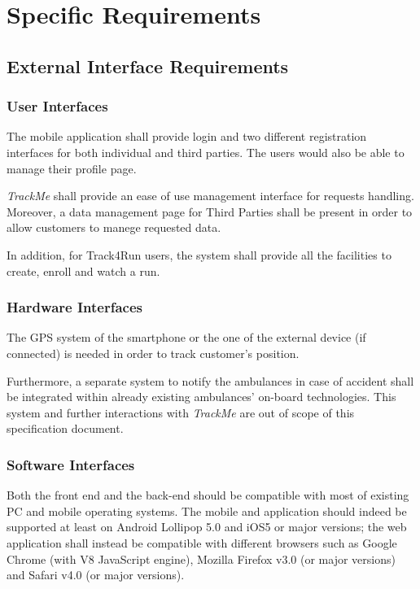 \documentclass[a4paper]{article}
\begin{document}
\section{Specific Requirements}

    \subsection{External Interface Requirements}
        
        \subsubsection{User Interfaces}
        
        The mobile application shall provide login and two different registration interfaces for both individual and third parties. The users would also be able to manage their profile page.
        
        \textit{TrackMe} shall provide an ease of use management interface for requests handling. Moreover, a data management page for Third Parties shall be present in order to allow customers to manege requested data.
        
        In addition, for Track4Run users, the system shall provide all the facilities to create, enroll and watch a run.
        
        \subsubsection{Hardware Interfaces}
        The GPS system of the smartphone or the one of the external device (if connected) is needed in order to track customer's position.
        
        Furthermore, a separate system to notify the ambulances in case of accident shall be integrated within already existing ambulances' on-board technologies. This system and further interactions with \textit{TrackMe} are out of scope of this specification document.
        
        \subsubsection{Software Interfaces}
        Both the front end and the back-end should be compatible with most of existing PC and mobile operating systems. The mobile and application should indeed be supported at least on Android Lollipop 5.0 and iOS5 or major versions; the web application shall instead be compatible with different browsers such as Google Chrome (with V8 JavaScript engine), Mozilla Firefox v3.0 (or major versions) and Safari v4.0 (or major versions).
        
\end{document}
